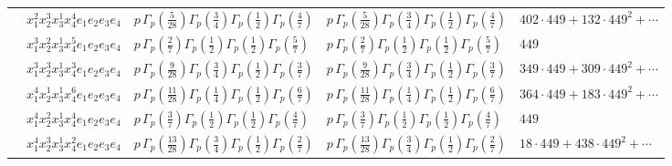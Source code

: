 \documentclass[11pt]{article}
\begin{document}
\begin{table}[ht]
{\begin{tabular}{@{}lllll@{}}
 & $x_{1}^{2} x_{2}^{3} x_{3}^{1} x_{4}^{4}  e_{1} e_{2} e_{3} e_{4}$ & $p \, \Gamma_p \left( \frac{5}{28} \right) \Gamma_p \left( \frac{3}{4} \right) \Gamma_p \left( \frac{1}{2} \right) \Gamma_p \left( \frac{4}{7} \right)$ & $p \, \Gamma_p \left( \frac{5}{28} \right) \Gamma_p \left( \frac{3}{4} \right) \Gamma_p \left( \frac{1}{2} \right) \Gamma_p \left( \frac{4}{7} \right)$ & $402{\cdot}449{+}132{\cdot}449^{2}{+}\cdots$ \\
 & $x_{1}^{3} x_{2}^{2} x_{3}^{1} x_{4}^{5}  e_{1} e_{2} e_{3} e_{4}$ & $p \, \Gamma_p \left( \frac{2}{7} \right) \Gamma_p \left( \frac{1}{2} \right) \Gamma_p \left( \frac{1}{2} \right) \Gamma_p \left( \frac{5}{7} \right)$ & $p \, \Gamma_p \left( \frac{2}{7} \right) \Gamma_p \left( \frac{1}{2} \right) \Gamma_p \left( \frac{1}{2} \right) \Gamma_p \left( \frac{5}{7} \right)$ & $449$ \\
 & $x_{1}^{3} x_{2}^{3} x_{3}^{1} x_{4}^{3}  e_{1} e_{2} e_{3} e_{4}$ & $p \, \Gamma_p \left( \frac{9}{28} \right) \Gamma_p \left( \frac{3}{4} \right) \Gamma_p \left( \frac{1}{2} \right) \Gamma_p \left( \frac{3}{7} \right)$ & $p \, \Gamma_p \left( \frac{9}{28} \right) \Gamma_p \left( \frac{3}{4} \right) \Gamma_p \left( \frac{1}{2} \right) \Gamma_p \left( \frac{3}{7} \right)$ & $349{\cdot}449{+}309{\cdot}449^{2}{+}\cdots$ \\
 & $x_{1}^{4} x_{2}^{1} x_{3}^{1} x_{4}^{6}  e_{1} e_{2} e_{3} e_{4}$ & $p \, \Gamma_p \left( \frac{11}{28} \right) \Gamma_p \left( \frac{1}{4} \right) \Gamma_p \left( \frac{1}{2} \right) \Gamma_p \left( \frac{6}{7} \right)$ & $p \, \Gamma_p \left( \frac{11}{28} \right) \Gamma_p \left( \frac{1}{4} \right) \Gamma_p \left( \frac{1}{2} \right) \Gamma_p \left( \frac{6}{7} \right)$ & $364{\cdot}449{+}183{\cdot}449^{2}{+}\cdots$ \\
 & $x_{1}^{4} x_{2}^{2} x_{3}^{1} x_{4}^{4}  e_{1} e_{2} e_{3} e_{4}$ & $p \, \Gamma_p \left( \frac{3}{7} \right) \Gamma_p \left( \frac{1}{2} \right) \Gamma_p \left( \frac{1}{2} \right) \Gamma_p \left( \frac{4}{7} \right)$ & $p \, \Gamma_p \left( \frac{3}{7} \right) \Gamma_p \left( \frac{1}{2} \right) \Gamma_p \left( \frac{1}{2} \right) \Gamma_p \left( \frac{4}{7} \right)$ & $449$ \\
 & $x_{1}^{4} x_{2}^{3} x_{3}^{1} x_{4}^{2}  e_{1} e_{2} e_{3} e_{4}$ & $p \, \Gamma_p \left( \frac{13}{28} \right) \Gamma_p \left( \frac{3}{4} \right) \Gamma_p \left( \frac{1}{2} \right) \Gamma_p \left( \frac{2}{7} \right)$ & $p \, \Gamma_p \left( \frac{13}{28} \right) \Gamma_p \left( \frac{3}{4} \right) \Gamma_p \left( \frac{1}{2} \right) \Gamma_p \left( \frac{2}{7} \right)$ & $18{\cdot}449{+}438{\cdot}449^{2}{+}\cdots$ \\

\end{tabular}}
\end{table}
\end{document}

